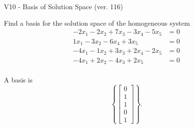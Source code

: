 \begin{exercise}
  \begin{exerciseTitle}V10 - Basis of Solution Space (ver. 116)\end{exerciseTitle}
  \begin{exerciseStatement}
    Find a basis for the solution space of the homogeneous system 
\begin{align*}
 -2 x_ 1 -2 x_ 2 + 7 x_ 3 -3 x_ 4 -5 x_ 5 &= 0  \\ 
  1 x_ 1 -3 x_ 2 -6 x_ 4 + 3 x_ 5 &= 0  \\ 
  -4 x_ 1 -1 x_ 2 + 3 x_ 3 + 2 x_ 4 -2 x_ 5 &= 0  \\ 
  -4 x_ 1 + 2 x_ 2 -4 x_ 3 + 2 x_ 5 &= 0  \\ 
 \end{align*}


 
  \end{exerciseStatement}

  \begin{exerciseAnswer}
   A basis is   
\[\left\{\left[\begin{array}{c}
0 \\
1 \\
1 \\
0 \\
1
\end{array}\right]\right\}.\]

  


  \end{exerciseAnswer}
\end{exercise}